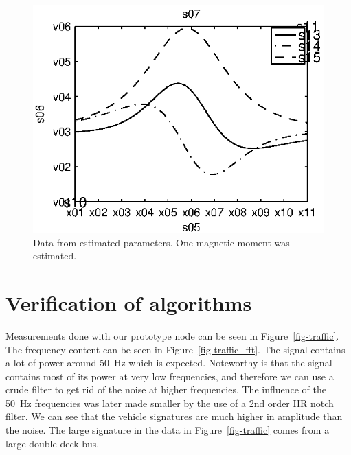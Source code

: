 \begin{subfigures}
\begin{figure}[!htb]
  \centering
%   
   \begin{minipage}{0.45\linewidth}
    \centering
    
    \includegraphics[width=\linewidth]{images/meas_data_one}
   \caption[Data from estimated parameters, one magnetic moment.]{Data from estimated parameters. One magnetic moment was estimated.}
   \label{fig-est_data_one}
   \end{minipage}
  \end{figure}
\end{subfigures}

\section{Verification of algorithms}

Measurements done with our prototype node can be seen in Figure~\ref{fig-traffic}. The frequency content can be seen in Figure~\ref{fig-traffic_fft}. The signal contains a lot of power around 50~Hz which is expected. Noteworthy is that the signal contains most of its power at very low frequencies, and therefore we can use a crude filter to get rid of the noise at higher frequencies. The influence of the 50~Hz frequencies was later made smaller by the use of a 2nd order IIR notch filter. We can see that the vehicle signatures are much higher in amplitude than the noise. The large signature in the data in Figure~\ref{fig-traffic} comes from a large double-deck bus.

